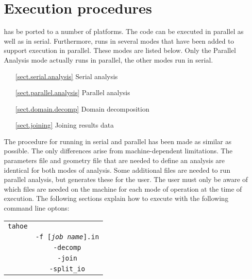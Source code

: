 
\section{Execution procedures}
\tahoe has be ported to a number of platforms.  The code can be executed in
parallel as well as in serial.  Furthermore, \tahoe runs in several modes
that have been added to support execution in parallel.  These modes are
listed below.  Only the Parallel Analysis mode actually runs in parallel,
the other modes run in serial.
\begin{itemize}
\item[\ref{sect.serial.analysis}] Serial analysis
\item[\ref{sect.parallel.analysis}] Parallel analysis
\item[\ref{sect.domain.decomp}] Domain decomposition
\item[\ref{sect.joining}] Joining results data
\end{itemize}
The procedure for running in serial and parallel has been made as similar
as possible.  The only differences arise from machine-dependent
limitations.  The parameters file and geometry file that are needed to
define an analysis are identical for both modes of analysis.  Some
additional files are needed to run parallel analysis, but \tahoe generates
these for the user.  The user must only be aware of which files are needed
on the machine for each mode of operation at the time of execution.  The
following sections explain how to execute \tahoe with the following command
line optons:
\begin{center}
\begin{tabular}[c]{c c}
\parbox[b]{2.0in}{\raggedleft \texttt{tahoe}} &\parbox[b]{2.0in}{}\\
&\parbox[b]{2.0in}{\texttt{-f [\textsl{job name}].in}}\\
&\parbox[b]{2.0in}{\texttt{-decomp}}\\
&\parbox[b]{2.0in}{\texttt{-join}}\\
&\parbox[b]{2.0in}{\texttt{-split\_io}}\\
\end{tabular}
\end{center}


